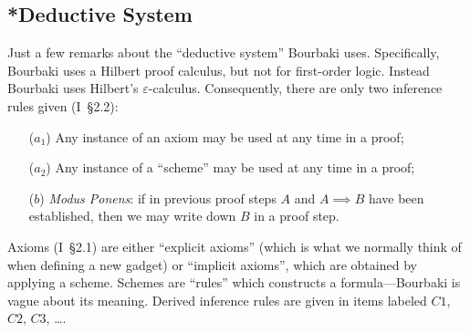 \documentclass{amsart}
\begin{document}
\subsection{*Deductive System}
Just a few remarks about the ``deductive system'' Bourbaki
uses. Specifically, Bourbaki uses a Hilbert proof calculus, but not for
first-order logic. Instead Bourbaki uses Hilbert's
$\varepsilon$-calculus. Consequently, there are only two inference rules
given (I~\S2.2):
\begin{itemize}
\item[($a_{1}$)] Any instance of an axiom may be used at any time in a proof;
\item[($a_{2}$)] Any instance of a ``scheme'' may be used at any time in a proof;
\item[($b$)] \textit{Modus Ponens}: if in previous proof steps $A$ and
  $A\implies B$ have been established, then we may write down $B$ in a
  proof step.
\end{itemize}
Axioms (I~\S2.1) are either ``explicit axioms'' (which is what we
normally think of when defining a new gadget) or ``implicit axioms'',
which are obtained by applying a scheme. Schemes are ``rules'' which
constructs a formula---Bourbaki is vague about its meaning. Derived
inference rules are given in items labeled $C1$, $C2$, $C3$, \dots.
\end{document}
